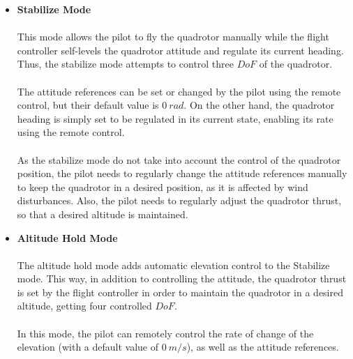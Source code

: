 \begin{itemize}
\item \textbf{Stabilize Mode}\\\\
This mode allows the pilot to fly the quadrotor manually while the flight controller self-levels the quadrotor attitude and regulate its current heading. Thus, the stabilize mode attempts to control three $DoF$ of the quadrotor.\\\\
The attitude references can be set or changed by the pilot using the remote control, but their default value is $0\ rad$. On the other hand, the quadrotor heading is simply set to be regulated in its current state, enabling its rate using the remote control.
\\\\
As the stabilize mode do not take into account the control of the quadrotor position, the pilot needs to regularly change the attitude references manually to keep the quadrotor in a desired position, as it is affected by wind disturbances. Also, the pilot needs to regularly adjust the quadrotor thrust, so that a desired altitude is maintained.

\item \textbf{Altitude Hold Mode}\\\\
The altitude hold mode adds automatic elevation control to the Stabilize mode. This way, in addition to controlling the attitude, the quadrotor thrust is set by the flight controller in order to maintain the quadrotor in a desired altitude, getting four controlled $DoF$.
\\\\
In this mode, the pilot can remotely control the rate of change of the elevation (with a default value of $0\ m/s$), as well as the attitude references.


\end{itemize}
